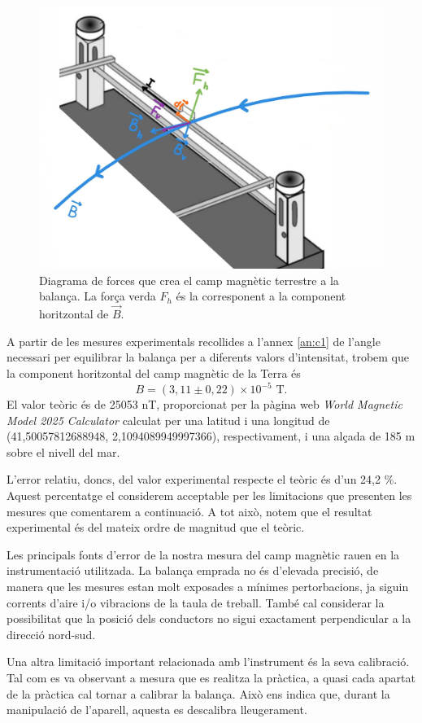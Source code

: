 \documentclass[a4paper,10.5pt]{report}
\begin{document}
\begin{figure}[H]
	\centering
	\includegraphics[width=0.35\linewidth]{screenshot019}
	\caption{Diagrama de forces que crea el camp magnètic terrestre a la balança. La força verda $F_h$ és la corresponent a la component horitzontal de $\vec{B}$.}
	\label{fig2:6}
\end{figure}


A partir de les mesures experimentals recollides a l'annex \ref{an:c1} de l'angle necessari per equilibrar la balança per a diferents valors d'intensitat, trobem que la component horitzontal del camp magnètic de la Terra és
\begin{equation*}
	B=(3,11 \pm 0,22)\times 10^{-5} \text{ T}.
\end{equation*}
El valor teòric és de 25053 nT, proporcionat per la pàgina web \textit{World Magnetic Model 2025 Calculator}\cite{ref2} calculat per una latitud i una longitud de (41,50057812688948, 2,1094089949997366), respectivament, i una alçada de 185 m sobre el nivell del mar. 

L'error relatiu, doncs, del valor experimental respecte el teòric és d'un 24,2 \%. Aquest percentatge el considerem acceptable per les limitacions que presenten les mesures que comentarem a continuació. A tot això, notem que el resultat experimental és del mateix ordre de magnitud que el teòric.

Les principals fonts d'error de la nostra mesura del camp magnètic rauen en la instrumentació utilitzada. La balança emprada no és d'elevada precisió, de manera que les mesures estan molt exposades a mínimes pertorbacions, ja siguin corrents d'aire i/o vibracions de la taula de treball. També cal considerar la possibilitat que la posició dels conductors no sigui exactament perpendicular a la direcció nord-sud.

Una altra limitació important relacionada amb l'instrument és la seva calibració. Tal com es va observant a mesura que es realitza la pràctica, a quasi cada apartat de la pràctica cal tornar a calibrar la balança. Això ens indica que, durant la manipulació de l'aparell, aquesta es descalibra lleugerament.
\end{document}
